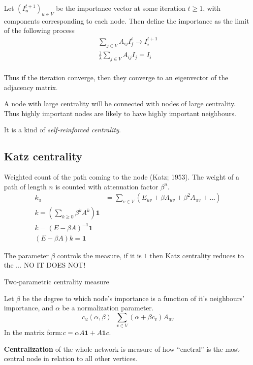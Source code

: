 \documentclass[a4paper]{article}
\newcommand{\brac}[1]{{\left ( #1 \right )}}
\newcommand{\defn}{\mathop{\overset{\Delta}{=}}\nolimits}
\begin{document}
Let $\brac{I^{t+1}_u}_{u\in V}$ be the importance vector at some iteration $t\geq1$, with components corresponding to each node. Then define the importance as the limit of the following process
\begin{align*}
	\sum_{j\in V} A_{ij} I^t_j \to I^{t+1}_i \\
	\frac{1}{\lambda}\sum_{j\in V} A_{ij} I_j = I_i \\
\end{align*}

Thus if the iteration converge, then they converge to an eigenvector of the adjacency matrix.

A node with large centrality will be connected with nodes of large centrality. Thus highly important nodes are likely to have highly important neighbours.

It is a kind of \emph{self-reinforced centrality}.


\subsection{Katz centrality} %
\label{sub:katz_centrality}

Weighted count of the path coming to the node (Katz; 1953). The weight of a path of length $n$ is counted with attenuation factor $\beta^n$.
\begin{align*}
	k_u &= \sum_{v\in V} \brac{E_{uv} + \beta A_{uv} + \beta^2 A_{uv} + \ldots}\\
	k = \brac{\sum_{k\geq0} \beta^k A^k} \mathbf{1} \\
	k = \brac{E - \beta A}^{-1} \mathbf{1} \\
	\brac{E - \beta A} k = \mathbf{1} 
\end{align*}

The parameter $\beta$ controls the measure, if it is $1$ then Katz centrality reduces to the ... NO IT DOES NOT!

Two-parametric centrality measure

Let $\beta$ be the degree to which node's importance is a function of it's neighbours' importance, and $\alpha$ be a normalization parameter.
\[c_u(\alpha,\beta) \defn \sum_{v\in V}\brac{\alpha+\beta c_v} A_{uv}\]
In the matrix form:$c = \alpha A\mathbf{1} + A\mathbf{1} c$.


\textbf{Centralization} of the whole network is measure of how ``cnetral'' is the most central node in relation to all other vertices.
\end{document}
